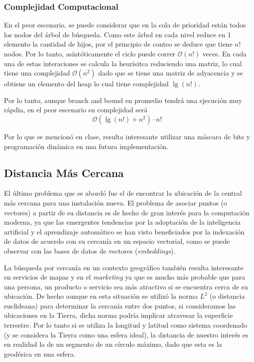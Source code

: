 \documentclass[12pt]{article}
\begin{document}
  \subsubsection{Complejidad Computacional}
  En el peor escenario, se puede considerar que en la cola de prioridad están todos
  los nodos del árbol de búsqueda. Como este árbol en cada nivel reduce en 1 elemento 
  la cantidad de hijos, por el principio de conteo se deduce que tiene $n!$ nodos. Por lo tanto,
  asíntóticamente el ciclo puede correr $\mathcal{O}(n!)$ veces. En cada una de estas interaciones
  se calcula la heurísitca reduciendo una matriz, lo cual tiene una complejidad $\mathcal{O}(n^2)$ dado que se tiene
  una matriz de adyacencia y se obtiene un elemento del heap lo cual tiene complejidad $\lg(n!)$.

  Por lo tanto, aunque branch and bound en promedio tendrá una ejecución muy rápdia, en el peor escenario
  su complejidad será
  \begin{equation}
    \mathcal{O}\left(\lg(n!) + n^2\right) \cdot n!
  \end{equation}

  Por lo que se mencionó en clase, resulta interesante utilizar una máscara de bits y programación dinámica en una futura
  implementación.

  \subsection{Distancia Más Cercana}
  El último problema que se abordó fue el de encontrar la ubicación de la central más cercana para una instalación nueva. El problema de asociar puntos (o vectores) a partir de su distancia 
  es de hecho de gran interés para la computación moderna, ya que las emergentes tendencias por la adoptación de la inteligencia artificial y el aprendizaje automático se han visto beneficiados
  por la indexación de datos de acuerdo con su cercanía en un espacio vectorial, como se puede observar con las bases de datos de vectores (\textit{embeddings}). 
  
  La búsqueda por cercanía en un contexto geográfico también resulta interesante en servicios de mapas y en el \textit{marketing} ya que es mucho más probable que para una persona, un producto o 
  servicio sea más atractivo si se encuentra cerca de su ubicación. De hecho aunque en esta situación se utilizó la norma $L^{2}$ (o distancia euclideana) para determinar la cercanía entre dos puntos, 
  si consideramos las ubicaciones en la Tierra, dicha norma podría implicar atravesar la superficie terrestre. Por lo tanto si se utiliza la longitud y latitud como sistema 
  coordenado (y se considera la Tierra como una esfera ideal), la distancia de nuestro interés es en realidad la de un segmento de un círculo máximo, dado que esta es la geodésica en una esfera.
\end{document}
